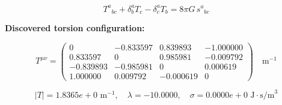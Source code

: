 
\begin{equation}
  T^a{}_{bc} + \delta^a_b T_c - \delta^a_c T_b = 8\pi G \, s^a{}_{bc}
\end{equation}

\textbf{Discovered torsion configuration:}

\begin{equation}
  T^{\mu\nu} = \begin{pmatrix}
    0 & -0.833597 & 0.839893 & -1.000000 \\
    0.833597 & 0 & 0.985981 & -0.009792 \\
    -0.839893 & -0.985981 & 0 & 0.000619 \\
    1.000000 & 0.009792 & -0.000619 & 0
  \end{pmatrix} \quad \text{m}^{-1}
\end{equation}

\begin{equation}
  |T| = 1.8365e+0 \text{ m}^{-1}, \quad
  \lambda = -10.0000, \quad
  \sigma = 0.0000e+0 \text{ J}\cdot\text{s/m}^3
\end{equation}
